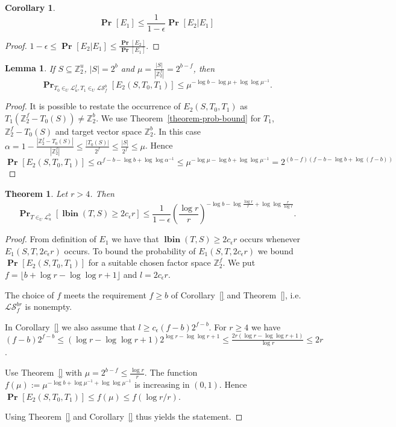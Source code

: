 \documentclass{article}
\newcommand{\lbin}[2]{\operatorname{\mathbf{lbin}}({#1}, {#2})}
\newcommand{\vecspace}[2]{\mathbb{Z}_{#1}^{#2}}
\newcommand{\binvecspace}[1]{\vecspace{2}{#1}}
\newcommand{\linearmaps}[2]{\mathcal{L}_{#1}^{#2}}
\newcommand{\surjectivelinearmaps}[2]{\mathcal{LS}_{#1}^{#2}}
\newcommand{\probs}[2]{\operatorname{\mathbf{Pr}}_{{#1}}\left[{#2}\right]}
\newcommand{\prob}[1]{\probs{}{#1}}
\newtheorem{lemma}{Lemma}
\newtheorem{theorem}{Theorem}
\newtheorem{corollary}{Corollary}
\begin{document}
\begin{corollary}
\[
\probs{}{E_1} \leq \frac{1}{1 - \epsilon}\probs{}{E_2 | E_1}
\]
\end{corollary}
\begin{proof}
$1- \epsilon \leq \prob{E_2 | E_1} \leq \frac{\prob{E_2}}{\prob{E_1}}$.
\end{proof}

\begin{lemma}
If $S \subseteq \binvecspace{u}$, $|S| = 2^b$ and $\mu = \frac{|S|}{|\binvecspace{f}|} = 2^{b - f}$, then
\[
\probs{T_0 \in_U \linearmaps{u}{f}, T_1 \in_U \surjectivelinearmaps{f}{b}}{E_2(S, T_0, T_1)} \leq \mu ^ {-\log b - \log \mu + \log \log \mu^{-1}}.
\]
\end{lemma}
\begin{proof}
It is possible to restate the occurrence of $E_2(S, T_0, T_1)$ as $T_1(\binvecspace{f} - T_0(S)) \neq \binvecspace{b}$.
We use Theorem~\ref{theorem-prob-bound} for $T_1$, $\binvecspace{f} - T_0(S)$ and target vector space $\binvecspace{b}$.
In this case $\alpha = 1 - \frac{|\binvecspace{f} - T_0(S)|}{|\binvecspace{f}|} \leq \frac{|T_0(S)|}{2^f} \leq \frac{|S|}{2^f} \leq \mu$.
Hence
\[
\prob{E_2(S, T_0, T_1)} \leq \alpha ^ {f - b - \log b + \log \log \alpha^{-1}} \leq \mu ^ {-\log \mu - \log b + \log \log \mu^{-1}} = 2^{(b - f)(f - b - \log b + \log (f - b))}
\]
\end{proof}

\begin{theorem}
\label{theorem-prob-distribution-bound}
Let $r > 4$. Then
\[
\probs{T \in_U \linearmaps{u}{b}}{\lbin{T}{S} \geq 2 c_\epsilon r} \leq \frac{1}{1 - \epsilon}\left(\frac{\log r}{r}\right)^{-\log b - \log \frac{\log r}{r} + \log \log \frac{r}{\log r}}.
\]
\end{theorem}
\begin{proof}
From definition of $E_1$ we have that $\lbin{T}{S} \geq 2 c_\epsilon r$ occurs whenever $E_1(S, T, 2 c_\epsilon r)$ occurs.
To bound the probability of $E_1(S, T, 2 c_\epsilon r)$ we bound $\prob{E_2(S, T_0, T_1)}$ for a suitable chosen factor space $\binvecspace{f}$.
We put $f = \lfloor b + \log r - \log \log r + 1 \rfloor$ and $l = 2c_\epsilon r$.

The choice of $f$ meets the requirement $f \geq b$ of Corollary~\ref{} and Theorem~\ref{}, i.e. $\surjectivelinearmaps{f}{br}$ is nonempty.

In Corollary~\ref{} we also assume that $l \geq c_\epsilon (f - b)2^{f - b}$.
For $r \geq 4$ we have $(f - b)2^{f - b} \leq (\log r - \log \log r + 1)2^{\log r - \log \log r + 1} \leq \frac{2r(\log r - \log \log r + 1)}{\log r} \leq 2r$.

Use Theorem~\ref{} with $\mu = 2^{b - f} \leq \frac{\log r}{r}$.
The function $f(\mu) := \mu ^ {- \log b + \log \mu^{-1} + \log \log \mu^{-1}}$ is increasing in $(0, 1)$.
Hence $\prob{E_2(S, T_0, T_1)} \leq f(\mu) \leq f(\log r/r)$.

Using Theorem~\ref{} and Corollary~\ref{} thus yields the statement.
\end{proof}
\end{document}
